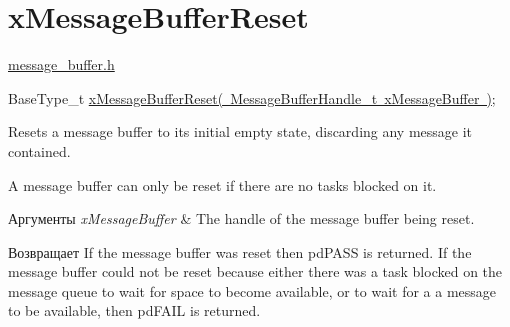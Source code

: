\hypertarget{group__x_message_buffer_reset}{}\section{x\+Message\+Buffer\+Reset}
\label{group__x_message_buffer_reset}
\mbox{\hyperlink{message__buffer_8h}{message\+\_\+buffer.\+h}} 
\begin{DoxyPre}
BaseType\_t \mbox{\hyperlink{message__buffer_8h_a6d22ac0fd0463b202f2e22674380a41c}{xMessageBufferReset( MessageBufferHandle\_t xMessageBuffer )}};
\end{DoxyPre}


Resets a message buffer to its initial empty state, discarding any message it contained.

A message buffer can only be reset if there are no tasks blocked on it.


\begin{DoxyParams}{Аргументы}
{\em x\+Message\+Buffer} & The handle of the message buffer being reset.\\
\hline
\end{DoxyParams}
\begin{DoxyReturn}{Возвращает}
If the message buffer was reset then pd\+P\+A\+SS is returned. If the message buffer could not be reset because either there was a task blocked on the message queue to wait for space to become available, or to wait for a a message to be available, then pd\+F\+A\+IL is returned. 
\end{DoxyReturn}

